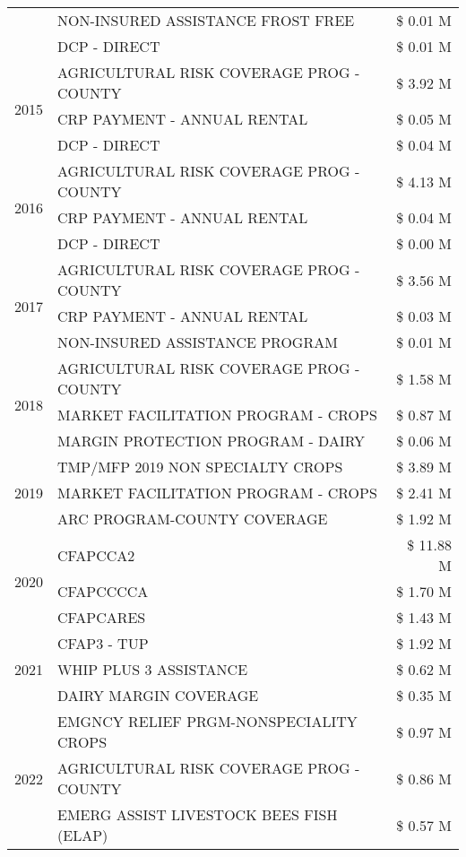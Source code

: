 \begin{tabular}{llr}
 & NON-INSURED ASSISTANCE FROST FREE & \$ 0.01 M \\
 & DCP - DIRECT & \$ 0.01 M \\
\cline{1-3}
\multirow[t]{3}{*}{2015} & AGRICULTURAL RISK COVERAGE PROG - COUNTY & \$ 3.92 M \\
 & CRP PAYMENT - ANNUAL RENTAL & \$ 0.05 M \\
 & DCP - DIRECT & \$ 0.04 M \\
\cline{1-3}
\multirow[t]{3}{*}{2016} & AGRICULTURAL RISK COVERAGE PROG - COUNTY & \$ 4.13 M \\
 & CRP PAYMENT - ANNUAL RENTAL & \$ 0.04 M \\
 & DCP - DIRECT & \$ 0.00 M \\
\cline{1-3}
\multirow[t]{3}{*}{2017} & AGRICULTURAL RISK COVERAGE PROG - COUNTY & \$ 3.56 M \\
 & CRP PAYMENT - ANNUAL RENTAL & \$ 0.03 M \\
 & NON-INSURED ASSISTANCE PROGRAM & \$ 0.01 M \\
\cline{1-3}
\multirow[t]{3}{*}{2018} & AGRICULTURAL RISK COVERAGE PROG - COUNTY & \$ 1.58 M \\
 & MARKET FACILITATION PROGRAM - CROPS & \$ 0.87 M \\
 & MARGIN PROTECTION PROGRAM - DAIRY & \$ 0.06 M \\
\cline{1-3}
\multirow[t]{3}{*}{2019} & TMP/MFP 2019 NON SPECIALTY CROPS & \$ 3.89 M \\
 & MARKET FACILITATION PROGRAM - CROPS & \$ 2.41 M \\
 & ARC PROGRAM-COUNTY COVERAGE & \$ 1.92 M \\
\cline{1-3}
\multirow[t]{3}{*}{2020} & CFAPCCA2 & \$ 11.88 M \\
 & CFAPCCCCA & \$ 1.70 M \\
 & CFAPCARES & \$ 1.43 M \\
\cline{1-3}
\multirow[t]{3}{*}{2021} & CFAP3 - TUP & \$ 1.92 M \\
 & WHIP PLUS 3 ASSISTANCE & \$ 0.62 M \\
 & DAIRY MARGIN COVERAGE & \$ 0.35 M \\
\cline{1-3}
\multirow[t]{3}{*}{2022} & EMGNCY RELIEF PRGM-NONSPECIALITY CROPS & \$ 0.97 M \\
 & AGRICULTURAL RISK COVERAGE PROG - COUNTY & \$ 0.86 M \\
 & EMERG ASSIST LIVESTOCK BEES FISH (ELAP) & \$ 0.57 M \\
\cline{1-3}
\bottomrule
\end{tabular}
